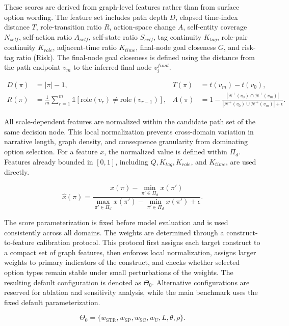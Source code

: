 \documentclass[pdflatex,sn-mathphys-num]{sn-jnl}%
\theoremstyle{thmstyleone}%
\theoremstyle{thmstyletwo}%
\theoremstyle{thmstylethree}%
\begin{document}
These scores are derived from graph-level features rather than from surface option wording. The feature set includes path depth $D$, elapsed time-index distance $T$, role-transition ratio $R$, action-space change $A$, self-entity coverage $N_{self}$, self-action ratio $A_{self}$, self-state ratio $S_{self}$, tag continuity $K_{tag}$, role-pair continuity $K_{role}$, adjacent-time ratio $K_{time}$, final-node goal closeness $G$, and risk-tag ratio (Risk). The final-node goal closeness is defined using the distance from the path endpoint $v_m$ to the inferred final node $v_i^{final}$.

\begin{align}
D(\pi)&=|\pi|-1, &
T(\pi)&=t(v_m)-t(v_0),\\
R(\pi)&=\frac{1}{m}\sum_{r=1}^{m}\mathbb{1}[\mathrm{role}(v_r)\ne \mathrm{role}(v_{r-1})],&
A(\pi)&=1-\frac{|\mathcal{N}^+(v_0)\cap\mathcal{N}^+(v_m)|}{|\mathcal{N}^+(v_0)\cup\mathcal{N}^+(v_m)|+\epsilon}.
\end{align}

All scale-dependent features are normalized within the candidate path set of the same decision node. This local normalization prevents cross-domain variation in narrative length, graph density, and consequence granularity from dominating option selection. For a feature $x$, the normalized value is defined within $\Pi_d$. Features already bounded in $[0,1]$, including $Q,K_{tag},K_{role}$, and $K_{time}$, are used directly.

\begin{equation}
\widehat{x}(\pi)=
\frac{x(\pi)-\min_{\pi'\in\Pi_d}x(\pi')}
{\max_{\pi'\in\Pi_d}x(\pi')-\min_{\pi'\in\Pi_d}x(\pi')+\epsilon}.
\end{equation}

The score parameterization is fixed before model evaluation and is used consistently across all domains. The weights are determined through a construct-to-feature calibration protocol. This protocol first assigns each target construct to a compact set of graph features, then enforces local normalization, assigns larger weights to primary indicators of the construct, and checks whether selected option types remain stable under small perturbations of the weights. The resulting default configuration is denoted as $\Theta_0$. Alternative configurations are reserved for ablation and sensitivity analysis, while the main benchmark uses the fixed default parameterization.

\begin{equation}
\Theta_0=\{w_{\mathrm{STR}},w_{\mathrm{SP}},w_{\mathrm{SC}},w_U,L,\theta,\rho\}.
\end{equation}
\end{document}
